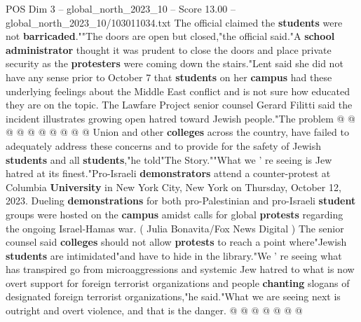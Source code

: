 \begin{textsample}{POS Dim 3 – global\_north\_2023\_10 – Score 13.00 – global\_north\_2023\_10/103011034.txt}
The official claimed the \textbf{students} were not \textbf{barricaded}.""The doors are open but closed,"the official said."A \textbf{school} \textbf{administrator} thought it was prudent to close the doors and place private security as the \textbf{protesters} were coming down the stairs."Lent said she did not have any sense prior to October 7 that \textbf{students} on her \textbf{campus} had these underlying feelings about the Middle East conflict and is not sure how educated they are on the topic.
The Lawfare Project senior counsel Gerard Filitti said the incident illustrates growing open hatred toward Jewish people."The problem @ @ @ @ @ @ @ @ @ @ Union and other \textbf{colleges} across the country, have failed to adequately address these concerns and to provide for the safety of Jewish \textbf{students} and all \textbf{students},"he told"The Story.""What we ' re seeing is Jew hatred at its finest."Pro-Israeli \textbf{demonstrators} attend a counter-protest at Columbia \textbf{University} in New York City, New York on Thursday, October 12, 2023.
Dueling \textbf{demonstrations} for both pro-Palestinian and pro-Israeli \textbf{student} groups were hosted on the \textbf{campus} amidst calls for global \textbf{protests} regarding the ongoing Israel-Hamas war. ( Julia Bonavita/Fox News Digital ) The senior counsel said \textbf{colleges} should not allow \textbf{protests} to reach a point where"Jewish \textbf{students} are intimidated"and have to hide in the library."We ' re seeing what has transpired go from microaggressions and systemic Jew hatred to what is now overt support for foreign terrorist organizations and people \textbf{chanting} slogans of designated foreign terrorist organizations,"he said."What we are seeing next is outright and overt violence, and that is the danger. @ @ @ @ @ @ @

\end{textsample}
